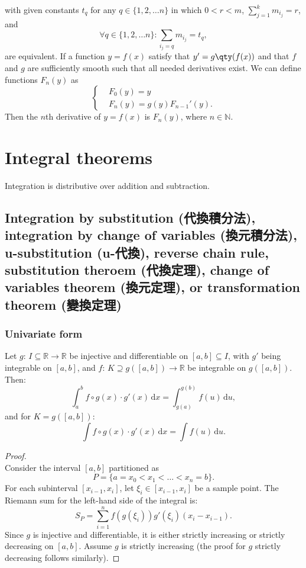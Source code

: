 \documentclass[a4paper,12pt]{report}
\begin{document}
{{{{{{{{{{{{with given constants $t_q$ for any $q\in\{1,2,\dots n\}$ in which $0<r<m$, $\sum_{j=1}^km_{i_j}=r$, and
\[\forall q\in\{1,2,\dots n\}\colon\sum_{i_j=q}m_{i_j}=t_q,\]
are equivalent.
If a function $y=f(x)$ satisfy that $y'=g\qty(f(x))$ and that $f$ and $g$ are sufficiently smooth such that all needed derivatives exist. We can define functions $F_n(y)$ as
\[\begin{cases}
&F_0(y)=y\\
&F_n(y)=g(y)F_{n-1}'(y).
\end{cases}\]
Then the $n$th derivative of $y=f(x)$ is $F_n(y)$, where $n\in\mathbb{N}$.



\section{Integral theorems}
Integration is distributive over addition and subtraction.
\subsection{Integration by substitution (代換積分法), integration by change of variables (換元積分法), u-substitution (u-代換), reverse chain rule, substitution theroem (代換定理), change of variables theorem (換元定理), or transformation theorem (變換定理)}
\subsubsection{Univariate form}
Let $g:\,I\subseteq\mathbb{R}\to\mathbb{R}$ be injective and differentiable on $[a,b]\subseteq I$, with $g'$ being integrable on $[a,b]$, and $f:\,K\supseteq g([a,b])\to\mathbb{R}$ be integrable on $g([a,b])$. Then:
\[\int_a^bf\circ g(x)\cdot g'(x)\,\mathrm{d}x=\int_{g(a)}^{g(b)}f(u)\,\mathrm{d}u,\]
and for $K=g([a,b])$:
\[\int f\circ g(x)\cdot g'(x)\,\mathrm{d}x=\int f(u)\,\mathrm{d}u.\]
\begin{proof}\mbox{}\\
Consider the interval \([a, b]\) partitioned as
\[P = \{a = x_0 < x_1 < \dots  < x_n = b\}.\]
For each subinterval \([x_{i-1}, x_i]\), let \(\xi_i \in [x_{i-1}, x_i]\) be a sample point. The Riemann sum for the left-hand side of the integral is:
\[S_P = \sum_{i=1}^n f(g(\xi_i)) g'(\xi_i) (x_i - x_{i-1}).\]
Since \(g\) is injective and differentiable, it is either strictly increasing or strictly decreasing on \([a, b]\). Assume \(g\) is strictly increasing (the proof for \(g\) strictly decreasing follows similarly).


\end{proof}}}}}}}}}}}}}
\end{document}
